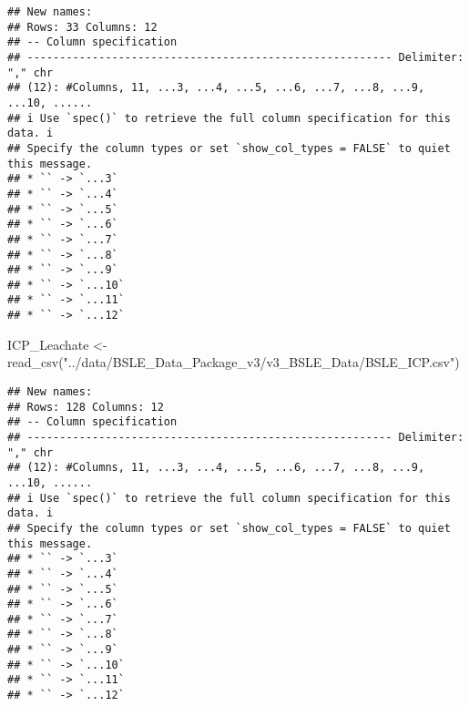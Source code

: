 \documentclass[
]{article}
\newenvironment{Shaded}{\begin{snugshade}}{\end{snugshade}}
\newcommand{\AttributeTok}[1]{\textcolor[rgb]{0.77,0.63,0.00}{#1}}
\newcommand{\CommentTok}[1]{\textcolor[rgb]{0.56,0.35,0.01}{\textit{#1}}}
\newcommand{\DecValTok}[1]{\textcolor[rgb]{0.00,0.00,0.81}{#1}}
\newcommand{\FunctionTok}[1]{\textcolor[rgb]{0.00,0.00,0.00}{#1}}
\newcommand{\NormalTok}[1]{#1}
\newcommand{\OtherTok}[1]{\textcolor[rgb]{0.56,0.35,0.01}{#1}}
\newcommand{\SpecialCharTok}[1]{\textcolor[rgb]{0.00,0.00,0.00}{#1}}
\newcommand{\StringTok}[1]{\textcolor[rgb]{0.31,0.60,0.02}{#1}}
\begin{document}
\begin{Shaded}
\end{Shaded}

\begin{verbatim}
## New names:
## Rows: 33 Columns: 12
## -- Column specification
## -------------------------------------------------------- Delimiter: "," chr
## (12): #Columns, 11, ...3, ...4, ...5, ...6, ...7, ...8, ...9, ...10, ......
## i Use `spec()` to retrieve the full column specification for this data. i
## Specify the column types or set `show_col_types = FALSE` to quiet this message.
## * `` -> `...3`
## * `` -> `...4`
## * `` -> `...5`
## * `` -> `...6`
## * `` -> `...7`
## * `` -> `...8`
## * `` -> `...9`
## * `` -> `...10`
## * `` -> `...11`
## * `` -> `...12`
\end{verbatim}

\begin{Shaded}
\begin{Highlighting}[]
\NormalTok{ICP\_Leachate }\OtherTok{\textless{}{-}} \FunctionTok{read\_csv}\NormalTok{(}\StringTok{"../data/BSLE\_Data\_Package\_v3/v3\_BSLE\_Data/BSLE\_ICP.csv"}\NormalTok{)}
\end{Highlighting}
\end{Shaded}

\begin{verbatim}
## New names:
## Rows: 128 Columns: 12
## -- Column specification
## -------------------------------------------------------- Delimiter: "," chr
## (12): #Columns, 11, ...3, ...4, ...5, ...6, ...7, ...8, ...9, ...10, ......
## i Use `spec()` to retrieve the full column specification for this data. i
## Specify the column types or set `show_col_types = FALSE` to quiet this message.
## * `` -> `...3`
## * `` -> `...4`
## * `` -> `...5`
## * `` -> `...6`
## * `` -> `...7`
## * `` -> `...8`
## * `` -> `...9`
## * `` -> `...10`
## * `` -> `...11`
## * `` -> `...12`
\end{verbatim}
\end{document}
